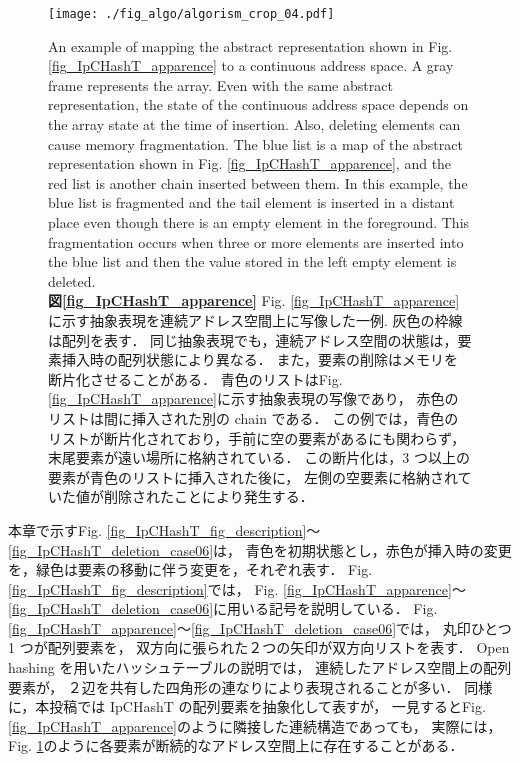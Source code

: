 \begin{figure}
  \texttt{[image: ./fig\_algo/algorism\_crop\_04.pdf]}
  \caption{
    An example of mapping the abstract representation shown in Fig. \ref{fig_IpCHashT_apparence} to a continuous address space.
    A gray frame represents the array.
    Even with the same abstract representation,
    the state of the continuous address space depends on the array state at the time of insertion.
    Also, deleting elements can cause memory fragmentation.
    The blue list is a map of the abstract representation shown in Fig. \ref{fig_IpCHashT_apparence},
    and the red list is another chain inserted between them.
    In this example,
    the blue list is fragmented and the tail element is inserted in a distant place
    even though there is an empty element in the foreground.
    This fragmentation occurs when three or more elements are inserted into the blue list
    and then the value stored in the left empty element is deleted.
    \\
    {\bf 図\ref{fig_IpCHashT_apparence}}
    Fig. \ref{fig_IpCHashT_apparence}に示す抽象表現を連続アドレス空間上に写像した一例.
    灰色の枠線は配列を表す．
    同じ抽象表現でも，連続アドレス空間の状態は，要素挿入時の配列状態により異なる．
    また，要素の削除はメモリを断片化させることがある．
    青色のリストはFig. \ref{fig_IpCHashT_apparence}に示す抽象表現の写像であり，
    赤色のリストは間に挿入された別の chain である．
    この例では，青色のリストが断片化されており，手前に空の要素があるにも関わらず，末尾要素が遠い場所に格納されている．
    この断片化は，3 つ以上の要素が青色のリストに挿入された後に，
    左側の空要素に格納されていた値が削除されたことにより発生する．
  }
  \label{fig_IpCHashT_insert_introspection}
\end{figure}

本章で示すFig. \ref{fig_IpCHashT_fig_description}〜\ref{fig_IpCHashT_deletion_case06}は，
青色を初期状態とし，赤色が挿入時の変更を，緑色は要素の移動に伴う変更を，それぞれ表す．
Fig. \ref{fig_IpCHashT_fig_description}では，
Fig. \ref{fig_IpCHashT_apparence}〜\ref{fig_IpCHashT_deletion_case06}に用いる記号を説明している．
Fig. \ref{fig_IpCHashT_apparence}〜\ref{fig_IpCHashT_deletion_case06}では，
丸印ひとつ 1 つが配列要素を，
双方向に張られた２つの矢印が双方向リストを表す．
Open hashing を用いたハッシュテーブルの説明では，
連続したアドレス空間上の配列要素が，
２辺を共有した四角形の連なりにより表現されることが多い．
同様に，本投稿では IpCHashT の配列要素を抽象化して表すが，
一見するとFig. \ref{fig_IpCHashT_apparence}のように隣接した連続構造であっても，
実際には，Fig. \ref{fig_IpCHashT_insert_introspection}のように各要素が断続的なアドレス空間上に存在することがある．

